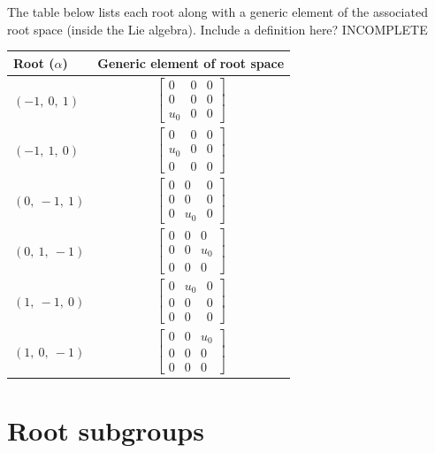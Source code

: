 \documentclass[11pt]{article}
\newcommand{\noi}{\noindent}
\theoremstyle{definition}
\begin{document}
\noi The table below lists each root along with a generic element of the associated root space (inside the Lie algebra). Include a definition here? INCOMPLETE

\bigskip

\noindent \begin{tabular}{|l|c|}
    \hline
    \textbf{Root ($\alpha$)} & \textbf{Generic element of root space} \\
    \hline
    $\left( -1, \  0, \  1\right)$ & $\left[\begin{matrix}0 & 0 & 0\\0 & 0 & 0\\u_{0} & 0 & 0\end{matrix}\right]$ \\
    \hline
    $\left( -1, \  1, \  0\right)$ & $\left[\begin{matrix}0 & 0 & 0\\u_{0} & 0 & 0\\0 & 0 & 0\end{matrix}\right]$ \\
    \hline
    $\left( 0, \  -1, \  1\right)$ & $\left[\begin{matrix}0 & 0 & 0\\0 & 0 & 0\\0 & u_{0} & 0\end{matrix}\right]$ \\
    \hline
    $\left( 0, \  1, \  -1\right)$ & $\left[\begin{matrix}0 & 0 & 0\\0 & 0 & u_{0}\\0 & 0 & 0\end{matrix}\right]$ \\
    \hline
    $\left( 1, \  -1, \  0\right)$ & $\left[\begin{matrix}0 & u_{0} & 0\\0 & 0 & 0\\0 & 0 & 0\end{matrix}\right]$ \\
    \hline
    $\left( 1, \  0, \  -1\right)$ & $\left[\begin{matrix}0 & 0 & u_{0}\\0 & 0 & 0\\0 & 0 & 0\end{matrix}\right]$ \\
    \hline
\end{tabular}


\newpage
\section{Root subgroups}
\end{document}
